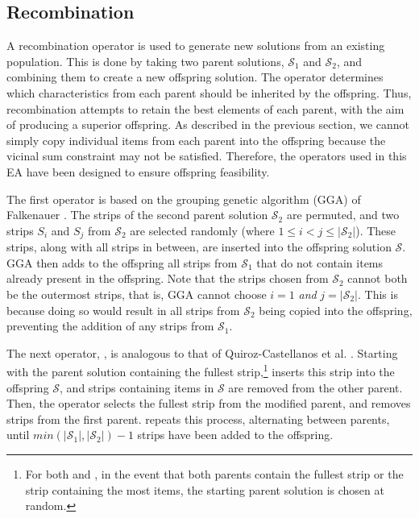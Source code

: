 \documentclass{elsarticle}
\begin{document}
\subsection{Recombination}
\label{sub:xover}
\noindent A recombination operator is used to generate new solutions from an existing population. This is done by taking two parent solutions, $\mathcal{S}_1$ and $\mathcal{S}_2$, and combining them to create a new offspring solution. The operator determines which characteristics from each parent should be inherited by the offspring. Thus, recombination attempts to retain the best elements of each parent, with the aim of producing a superior offspring. As described in the previous section, we cannot simply copy individual items from each parent into the offspring because the vicinal sum constraint may not be satisfied. Therefore, the operators used in this EA have been designed to ensure offspring feasibility.

The first operator is based on the grouping genetic algorithm (GGA) of Falkenauer \cite{falkenauer1992}. The strips of the second parent solution $\mathcal{S}_2$ are permuted, and two strips $S_i$ and $S_j$ from $\mathcal{S}_2$ are selected randomly (where $1 \leq i < j \leq |\mathcal{S}_2|$). These strips, along with all strips in between, are inserted into the offspring solution $\mathcal{S}$. GGA then adds to the offspring all strips from $\mathcal{S}_1$ that do not contain items already present in the offspring. Note that the strips chosen from $\mathcal{S}_2$ cannot both be the outermost strips, that is, GGA cannot choose $i = 1$ \emph{and} $j = |\mathcal{S}_2|$. This is because doing so would result in all strips from $\mathcal{S}_2$ being copied into the offspring, preventing the addition of any strips from $\mathcal{S}_1$. 

The next operator, , is analogous to that of Quiroz-Castellanos et al. \cite{quiroz2015}. Starting with the parent solution containing the fullest strip,\footnote{For both  and , in the event that both parents contain the fullest strip or the strip containing the most items, the starting parent solution is chosen at random.}  inserts this strip into the offspring $\mathcal{S}$, and strips containing items in $\mathcal{S}$ are removed from the other parent. Then, the operator selects the fullest strip from the modified parent, and removes strips from the first parent.  repeats this process, alternating between parents, until $min (|\mathcal{S}_1|,|\mathcal{S}_2|) - 1$ strips have been added to the offspring. 
\end{document}
